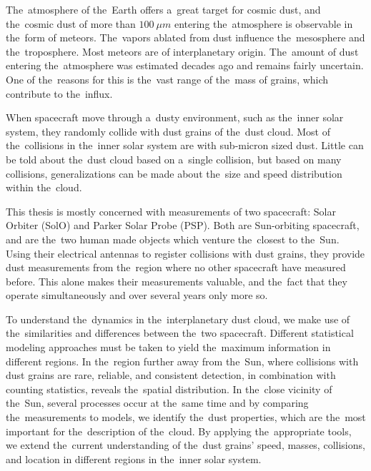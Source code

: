 The~atmosphere of the~Earth offers a~great target for cosmic dust, and the~cosmic dust of more than $\SI{100}{\mu m}$ entering the~atmosphere is observable in the~form of meteors. The~vapors ablated from dust influence the~mesosphere and the~troposphere. Most meteors are of interplanetary origin. The~amount of dust entering the~atmosphere was estimated decades ago and remains fairly uncertain. One of the~reasons for this is the~vast range of the~mass of grains, which contribute to the~influx.

When spacecraft move through a~dusty environment, such as the~inner solar system, they randomly collide with dust grains of the~dust cloud. Most of the~collisions in the~inner solar system are with sub-micron sized dust. Little can be told about the~dust cloud based on a~single collision, but based on many collisions, generalizations can be made about the~size and speed distribution within the~cloud. 

This thesis is mostly concerned with measurements of two spacecraft: Solar Orbiter (SolO) and Parker Solar Probe (PSP). Both are Sun-orbiting spacecraft, and are the~two human made objects which venture the~closest to the~Sun. Using their electrical antennas to register collisions with dust grains, they provide dust measurements from the~region where no other spacecraft have measured before. This alone makes their measurements valuable, and the~fact that they operate simultaneously and over several years only more so.

To understand the~dynamics in the~interplanetary dust cloud, we make use of the~similarities and differences between the~two spacecraft. Different statistical modeling approaches must be taken to yield the~maximum information in different regions. In the~region further away from the~Sun, where collisions with dust grains are rare, reliable, and consistent detection, in combination with counting statistics, reveals the~spatial distribution. In the~close vicinity of the~Sun, several processes occur at the~same time and by comparing the~measurements to models, we identify the~dust properties, which are the~most important for the~description of the~cloud. By applying the~appropriate tools, we extend the~current understanding of the~dust grains' speed, masses, collisions, and location in different regions in the~inner solar system.


